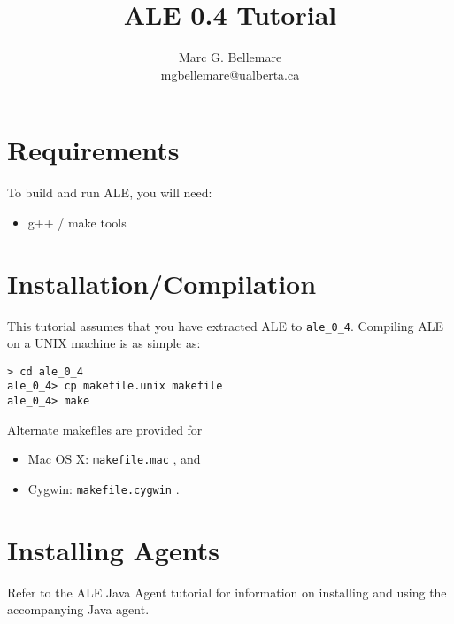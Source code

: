 \documentclass[12pt]{article}
\title{ALE 0.4 Tutorial}
\author{Marc G. Bellemare\\ mgbellemare@ualberta.ca}
\begin{document}
\maketitle

\section{Requirements}

To build and run ALE, you will need:

\begin{itemize}
  \item{g++ / make tools}
\end{itemize}

\section{Installation/Compilation}

This tutorial assumes that you have extracted ALE to \verb+ale_0_4+. Compiling
ALE on a UNIX machine is as simple as:

\begin{verbatim}
> cd ale_0_4
ale_0_4> cp makefile.unix makefile
ale_0_4> make
\end{verbatim}

Alternate makefiles are provided for 

\begin{itemize}
  \item{Mac OS X: \verb+makefile.mac+ , and}
  \item{Cygwin: \verb+makefile.cygwin+ .}
\end{itemize}

\section{Installing Agents}

Refer to the ALE Java Agent tutorial for information on installing and using 
the accompanying Java agent.
\end{document}
